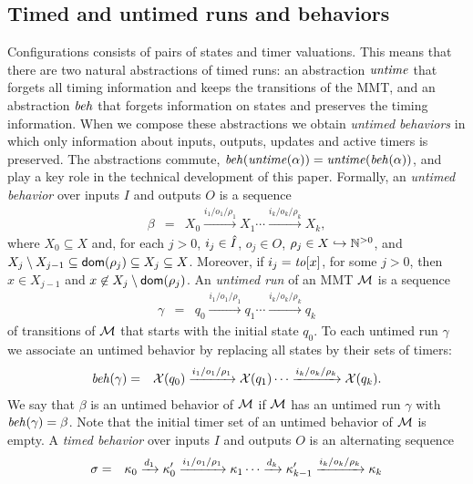 \subsection{Timed and untimed runs and behaviors}
Configurations consists of pairs of states and timer valuations. This means that there are two natural abstractions of
timed runs: an abstraction $\mathit{untime}$ that forgets all timing information and keeps the transitions of the MMT, 
and an abstraction $\mathit{beh}$ that forgets information on states and preserves the timing information.
When we compose these abstractions we obtain \emph{untimed behaviors} in which only information about inputs, outputs,
updates and active timers is preserved.
The abstractions commute, $\mathit{beh}(\mathit{untime}(\alpha))=\mathit{untime}(\mathit{beh}(\alpha))$, and play a key role in
the technical development of this paper.
%
Formally, an \emph{untimed behavior} over inputs $I$ and outputs $O$ is a sequence 
\begin{eqnarray*}
\beta & = & X_0 \xrightarrow{i_1/o_1/\rho_1} X_1  \cdots \xrightarrow{i_k/o_k/\rho_k} X_{k},
\end{eqnarray*}
where $X_0 \subseteq X$ and, for each $j>0$,  $i_j \in \hat{I}$, $o_j \in O$, $\rho_j \in X \hookrightarrow {\mathbb N}^{>0}$, and
 $X_j \setminus X_{j-1}  \subseteq {\textsf{dom}}(\rho_j) \subseteq X_j \subseteq X$.
Moreover, if $i_j = \mathit{to}[x]$, for some $j>0$, then $x \in X_{j-1}$ and $x \not\in X_j \setminus {\textsf{dom}}(\rho_j)$.
%
An \emph{untimed run} of an MMT ${\mathcal M}$ is a sequence
\begin{eqnarray*}
\gamma & = & q_0 \xrightarrow{i_1/o_1/\rho_1} q_1   \cdots \xrightarrow{i_k/o_k/\rho_k} q_k
\end{eqnarray*}
of transitions of ${\mathcal M}$ that starts with the initial state $q_0$. 
To each untimed run $\gamma$ we associate an untimed behavior by replacing all
states by their sets of timers:
\begin{eqnarray*}
\mathit{beh}(\gamma) & = & \mathcal{X}(q_0) \xrightarrow{i_1/o_1/\rho_1} \mathcal{X}(q_1)  \cdots \xrightarrow{i_k/o_k/\rho_k} \mathcal{X}(q_k).
\end{eqnarray*}
We say that $\beta$ is an untimed behavior of ${\mathcal M}$ if ${\mathcal M}$ has an untimed run $\gamma$ with $\mathit{beh}(\gamma) = \beta$.
Note that the initial timer set of an untimed behavior of ${\mathcal M}$ is empty.
%
A \emph{timed behavior} over inputs $I$ and outputs $O$ is an alternating sequence
\begin{eqnarray}
\label{timedbehavior}
\sigma & = & \kappa_0 \xrightarrow{d_1} \kappa'_0 \xrightarrow{i_1/o_1/\rho_1} \kappa_1 \cdots
\xrightarrow{d_k} \kappa'_{k-1} \xrightarrow{i_k/o_k/\rho_k} \kappa_{k}
\end{eqnarray}
